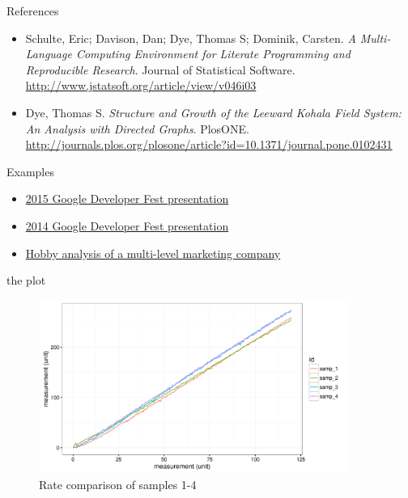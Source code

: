 \documentclass[aspectratio=169,presentation,bigger,fleqn,t]{beamer}
\begin{document}
\begin{frame}[label={sec:orgheadline26}]{References}
\begin{itemize}
\item Schulte, Eric; Davison, Dan; Dye, Thomas S; Dominik, Carsten. \emph{A Multi-Language Computing Environment for Literate Programming and Reproducible Research}. 
Journal of Statistical Software. \url{http://www.jstatsoft.org/article/view/v046i03}

\item Dye, Thomas S. \emph{Structure and Growth of the Leeward Kohala Field System: An
Analysis with Directed Graphs}. PlosONE. \url{http://journals.plos.org/plosone/article?id=10.1371/journal.pone.0102431}
\end{itemize}
\end{frame}
\begin{frame}[label={sec:orgheadline27}]{Examples}
\begin{itemize}
\item \href{https://github.com/jwhendy/devFest-shiny_2015}{2015 Google Developer Fest presentation}
\item \href{https://github.com/jwhendy/devFest-geo}{2014 Google Developer Fest presentation}
\item \href{https://drive.google.com/open?id=0BzQupOSnvw08anh6c3FwaGlHWVk}{Hobby analysis of a multi-level marketing company}
\end{itemize}
\end{frame}
\begin{frame}[label={sec:orgheadline28}]{the plot}
\begin{center}
\begin{figure}[htb]
\centering
\includegraphics[width=0.9\textwidth]{./demo/plots/rate-comparison.png}
\caption{Rate comparison of samples 1-4}
\end{figure}
\end{center}
\end{frame}
\end{document}
